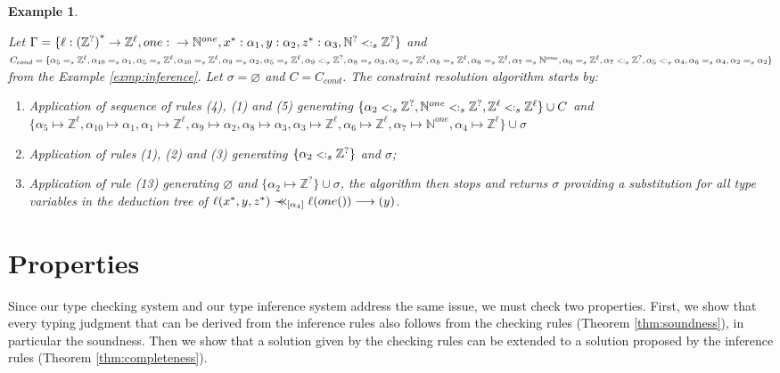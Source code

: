 \documentclass{eptcs}
\newcommand{\CC}{\ensuremath{C}\xspace}
\newcommand{\NN}{\ensuremath{\mathbb{N}}\xspace}
\newcommand{\ZZ}{\ensuremath{\mathbb{Z}}\xspace}
\newcommand{\match}{\mathrel{\mbox{$\prec\hspace{-0.5em}\prec$}}}
\newcommand{\sub}{\mathrel{\mbox{{\footnotesize $<:$}}}}
\newcommand{\sig}[2]{\ensuremath{{#1}\rightarrow{#2}}}
\newcommand{\vsig}[2]{\ensuremath{{#1}^*\rightarrow{#2}}}
\newtheorem{exmp}[thm]{Example}
\begin{document}
\begin{exmp}
\label{exmp:resolution}

Let $\Gamma = \{\ell : \vsig{(\ZZ^?)}{\ZZ^{\ell}}, one :
\sig{}{\NN^{one}}, x^* : \alpha_1, y : \alpha_2, z^* : \alpha_3, \NN^? \sub_s
\ZZ^?\}$ and
$\CC_{cond} = \{\alpha_5 =_s
\ZZ^{\ell}, \alpha_{10} =_s \alpha_1, \alpha_5 =_s \ZZ^{\ell}, \alpha_{10} =_s
\ZZ^{\ell}, \alpha_9 =_s
\alpha_2, \alpha_5 =_s \ZZ^{\ell},
\alpha_9 \sub_s \ZZ^?, \alpha_8 =_s \alpha_3, \alpha_5 =_s \ZZ^{\ell}, \alpha_8
=_s
\ZZ^{\ell},
\alpha_6 =_s \ZZ^{\ell},
\alpha_7 =_s \NN^{one}, \alpha_6 =_s \ZZ^{\ell}, \alpha_7 \sub_s \ZZ^?, \alpha_5 \sub_s
\alpha_4, \alpha_6 =_s \alpha_4, \alpha_2 =_s \alpha_2\}$ from the Example
\ref{exmp:inference}. Let $\sigma = \varnothing$ and $\CC = \CC_{cond}$. The constraint resolution algorithm
starts by:  
\begin{enumerate}
\item Application of sequence of rules (4), (1) and (5) generating 
$\{\alpha_2 \sub_s \ZZ^?, \NN^{one} \sub_s \ZZ^?, \ZZ^{\ell} \sub_s
\ZZ^{\ell}\} \cup \CC$
and
$\{\alpha_5 \mapsto \ZZ^{\ell}, \alpha_{10} \mapsto \alpha_1,
\alpha_1 \mapsto \ZZ^{\ell}, \alpha_9 \mapsto \alpha_2, \alpha_8 \mapsto \alpha_3,
\alpha_3 \mapsto \ZZ^{\ell}, \alpha_6
\mapsto \ZZ^{\ell}, \alpha_7 \mapsto \NN^{one}, \alpha_4 \mapsto \ZZ^{\ell}\} \cup \sigma$

\item Application of rules (1), (2) and (3) generating $\{\alpha_2 \sub_s \ZZ^?\}$ and $\sigma$;

\item Application of rule (13) generating $\varnothing$ and $\{\alpha_2 \mapsto
\ZZ^?\} \cup \sigma$, the algorithm then stops
and returns $\sigma$ providing a substitution for all type variables in
the deduction tree of $\ell(x^*,y,z^*) \match_{[\alpha_4]} \ell(one())
\longrightarrow (y)$.
\end{enumerate}
\end{exmp}



\section{Properties}
\label{sec:properties}

Since our type checking system and our type inference system address the same
issue, we must
check two properties. First, we show that every typing judgment that can be
derived from the inference rules also follows from the checking rules (Theorem
\ref{thm:soundness}), in particular the soundness. Then we show that a solution
given by the checking rules
can be extended to a solution proposed by the inference rules (Theorem
\ref{thm:completeness}).
\end{document}
